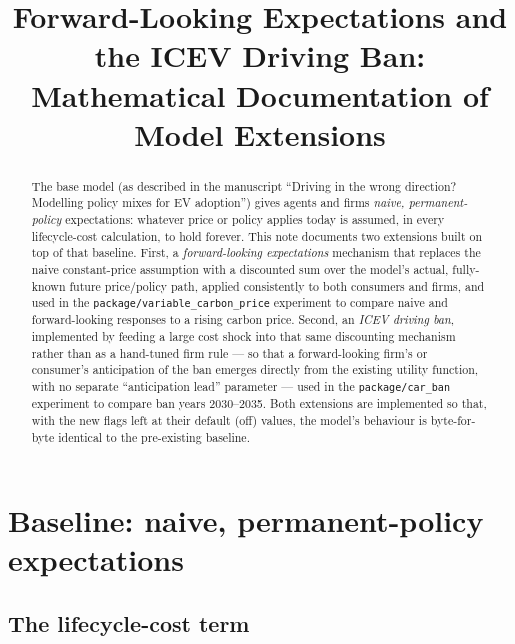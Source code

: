 \documentclass[11pt]{article}
\title{Forward-Looking Expectations and the ICEV Driving Ban:\\
Mathematical Documentation of Model Extensions}
\author{}
\date{}
\newcommand{\code}[1]{\texttt{#1}}
\begin{document}
\maketitle

\begin{abstract}
\noindent
The base model (as described in the manuscript ``Driving in the wrong
direction? Modelling policy mixes for EV adoption'') gives agents and firms
\emph{naive, permanent-policy} expectations: whatever price or policy applies
today is assumed, in every lifecycle-cost calculation, to hold forever. This
note documents two extensions built on top of that baseline. First, a
\emph{forward-looking expectations} mechanism that replaces the naive
constant-price assumption with a discounted sum over the model's actual,
fully-known future price/policy path, applied consistently to both consumers
and firms, and used in the \code{package/variable\_carbon\_price} experiment
to compare naive and forward-looking responses to a rising carbon price.
Second, an \emph{ICEV driving ban}, implemented by feeding a large cost
shock into that same discounting mechanism rather than as a hand-tuned firm
rule --- so that a forward-looking firm's or consumer's anticipation of the
ban emerges directly from the existing utility function, with no separate
``anticipation lead'' parameter --- used in the \code{package/car\_ban}
experiment to compare ban years 2030--2035. Both extensions are implemented
so that, with the new flags left at their default (off) values, the model's
behaviour is byte-for-byte identical to the pre-existing baseline.
\end{abstract}

\tableofcontents

\section{Baseline: naive, permanent-policy expectations}
\label{sec:baseline}

\subsection{The lifecycle-cost term}
\end{document}
